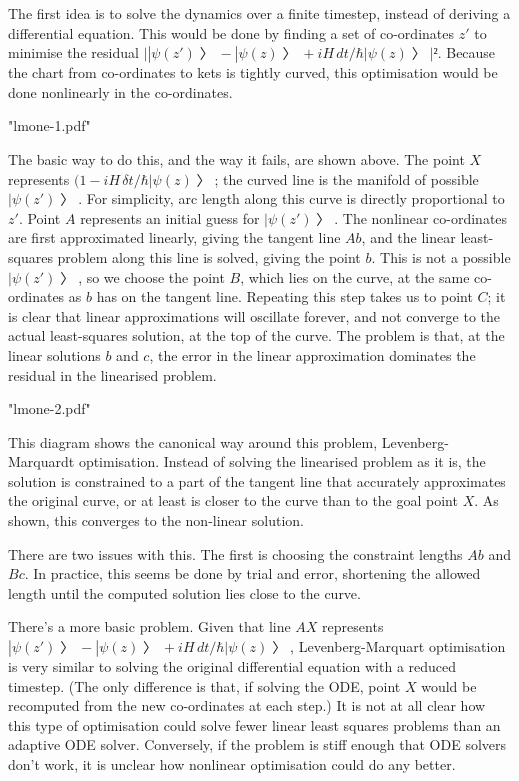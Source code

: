 
The first idea is to solve the dynamics over a finite timestep, instead of deriving a differential equation.  This would be done by finding a set of co-ordinates $z'$ to minimise the residual $\bigl| |ψ(z')〉-|ψ(z)〉+iH\,dt/\hbar|ψ(z)〉\bigr|².$  Because the chart from co-ordinates to kets is tightly curved, this optimisation would be done nonlinearly in the co-ordinates.

\centerline{\XeTeXpdffile "lmone-1.pdf"}

The basic way to do this, and the way it fails, are shown above.  The point $X$ represents $(1-iH\,δt/\hbar|ψ(z)〉$; the curved line is the manifold of possible $|ψ(z')〉$.  For simplicity, arc length along this curve is directly proportional to $z'$.  Point $A$ represents an initial guess for $|ψ(z')〉$.  The nonlinear co-ordinates are first approximated linearly, giving the tangent line $Ab$, and the linear least-squares problem along this line is solved, giving the point $b$.  This is not a possible $|ψ(z')〉$, so we choose the point $B$, which lies on the curve, at the same co-ordinates as $b$ has on the tangent line.  Repeating this step takes us to point $C$; it is clear that linear approximations will oscillate forever, and not converge to the actual least-squares solution, at the top of the curve.  The problem is that, at the linear solutions $b$ and $c$, the error in the linear approximation dominates the residual in the linearised problem.

\centerline{\XeTeXpdffile "lmone-2.pdf"}

This diagram shows the canonical way around this problem, Levenberg-Marquardt optimisation.  Instead of solving the linearised problem as it is, the solution is constrained to a part of the tangent line that accurately approximates the original curve, or at least is closer to the curve than to the goal point $X$.  As shown, this converges to the non-linear solution.

There are two issues with this.  The first is choosing the constraint lengths $Ab$ and $Bc$.  In practice, this seems be done by trial and error, shortening the allowed length until the computed solution lies close to the curve.

There's a more basic problem.  Given that line $AX$ represents $|ψ(z')〉-|ψ(z)〉+iH\,dt/\hbar|ψ(z)〉$, Levenberg-Marquart optimisation is very similar to solving the original differential equation with a reduced timestep.  (The only difference is that, if solving the ODE, point $X$ would be recomputed from the new co-ordinates at each step.)  It is not at all clear how this type of optimisation could solve fewer linear least squares problems than an adaptive ODE solver.  Conversely, if the problem is stiff enough that ODE solvers don't work, it is unclear how nonlinear optimisation could do any better.

